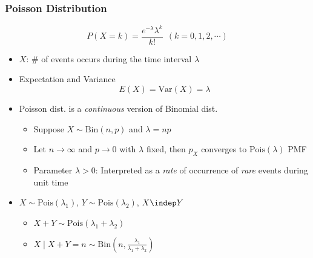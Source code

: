 \subsubsection*{Poisson Distribution}
\begin{equation}
    P(X=k)=\frac{e^{-\lambda}\lambda^k}{k!}~~(k=0,1,2,\cdots)
\end{equation}
\begin{itemize}
    \item $X$: \# of events occurs during the time interval $\lambda$
    \item Expectation and Variance
    \begin{equation}
        E(X)=\text{Var}(X)=\lambda
    \end{equation}
    \item Poisson dist. is a \textit{continuous} version of Binomial dist.
    \begin{itemize}
        \item Suppose $X\sim\text{Bin}(n,p)$ and $\lambda=np$
        \item Let $n\to\infty$ and $p\to 0$ with $\lambda$ fixed, then $p_X$ converges to $\text{Pois}(\lambda)$ PMF
        \item Parameter $\lambda>0$: Interpreted as a \textit{rate} of occurrence of \textit{rare} events during unit time
    \end{itemize}
    \item $X\sim\text{Pois}(\lambda_1)$, $Y\sim\text{Pois}(\lambda_2)$, $X\indep Y$
    \begin{itemize}
        \item $X+Y\sim\text{Pois}(\lambda_1+\lambda_2)$
        \item $X\mid X+Y=n\sim\text{Bin}\left(n,\frac{\lambda_1}{\lambda_1+\lambda_2}\right)$
    \end{itemize}
\end{itemize}
